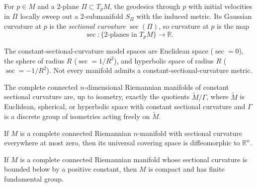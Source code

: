 For $p\in M$ and a $2$-plane $\Pi\subset T_pM$, the geodesics through $p$ with initial velocities
in $\Pi$ locally sweep out a $2$-submanifold $S_\Pi$ with the induced metric. Its Gaussian curvature
at $p$ is the \emph{sectional curvature} $\sec(\Pi)$, so curvature at $p$ is the map
\[
\sec\colon\{\text{2-planes in }T_pM\}\to\mathbb R.
\]

The constant-sectional-curvature model spaces are Euclidean space ($\sec=0$), the sphere of radius
$R$ ($\sec=1/R^2$), and hyperbolic space of radius $R$ ($\sec=-1/R^2$). Not every manifold admits a
constant-sectional-curvature metric.

\begin{theorem}
\label{thm:characterization-constant-curvature}


The complete connected $n$-dimensional Riemannian manifolds of constant sectional curvature are,
up to isometry, exactly the quotients $\widetilde M/\Gamma$, where $\widetilde M$ is Euclidean,
spherical, or hyperbolic space with constant sectional curvature and $\Gamma$ is a discrete group of
isometries acting freely on $\widetilde M$.
\end{theorem}

\begin{theorem}
\label{thm:cartan-hadamard-preview}


If $M$ is a complete connected Riemannian $n$-manifold with sectional curvature everywhere at most
zero, then its universal covering space is diffeomorphic to $\mathbb R^n$.
\end{theorem}

\begin{theorem}[Myers]
\label{thm:myers}


If $M$ is a complete connected Riemannian manifold whose sectional curvature is bounded below by a
positive constant, then $M$ is compact and has finite fundamental group.
\end{theorem}
